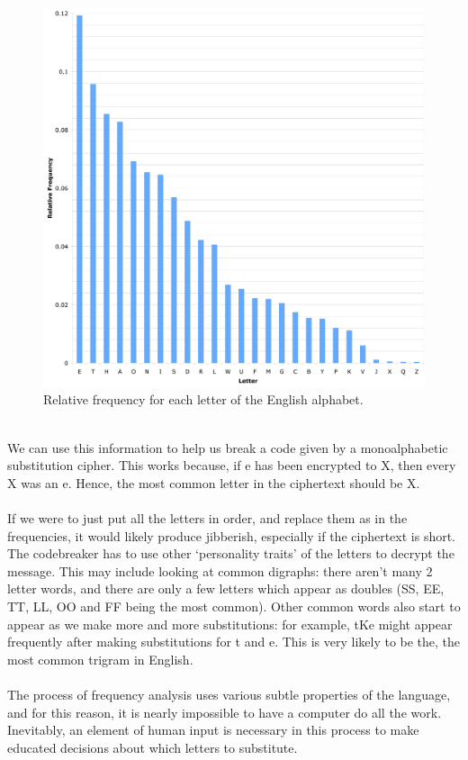 \documentclass[Lau,binding=0.6cm,oneside]{sapthesis}
\begin{document}
\begin{figure}[H]
\includegraphics[scale=0.35]{letter_frequency}
\centering
\caption{Relative frequency for each letter of the English alphabet.}
\centering
\end{figure}
\ \\
We can use this information to help us break a code given by a monoalphabetic substitution cipher. This works because, if \textsf{e} has been encrypted to \textsf{X}, then every \textsf{X} was an \textsf{e}. Hence, the most common letter in the ciphertext should be \textsf{X}.\\\\
If we were to just put all the letters in order, and replace them as in the frequencies, it would likely produce jibberish, especially if the ciphertext is short. The codebreaker has to use other `personality traits' of the letters to decrypt the message. This may include looking at common digraphs: there aren't many 2 letter words, and there are only a few letters which appear as doubles (\textsf{SS}, \textsf{EE}, \textsf{TT}, \textsf{LL}, \textsf{OO} and \textsf{FF} being the most common). Other common words also start to appear as we make more and more substitutions: for example, \textsf{tKe} might appear frequently after making substitutions for \textsf{t} and \textsf{e}. This is very likely to be \textsf{the}, the most common trigram in English.\\\\
The process of frequency analysis uses various subtle properties of the language, and for this reason, it is nearly impossible to have a computer do all the work. Inevitably, an element of human input is necessary in this process to make educated decisions about which letters to substitute.\\
\end{document}
